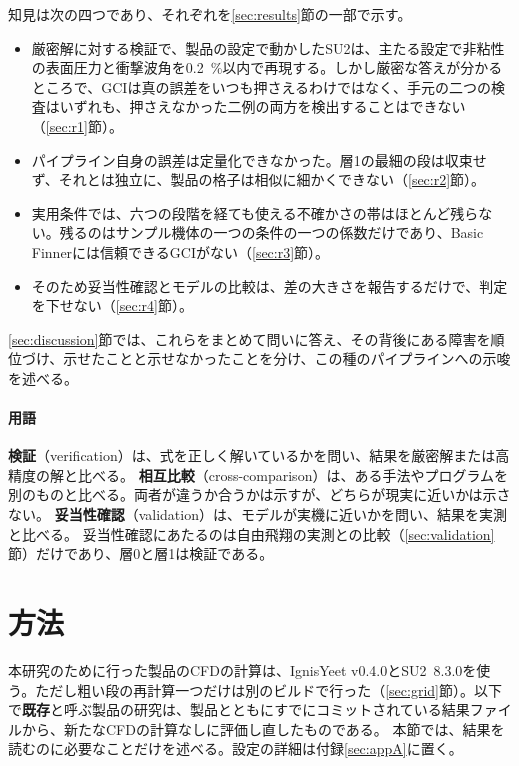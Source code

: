 \documentclass[twocolumn]{labreport}
\begin{document}
知見は次の四つであり、それぞれを\ref{sec:results}節の一部で示す。
\begin{itemize}
\item 厳密解に対する検証で、製品の設定で動かしたSU2は、主たる設定で非粘性の表面圧力と衝撃波角を0.2~\%以内で再現する。しかし厳密な答えが分かるところで、GCIは真の誤差をいつも押さえるわけではなく、手元の二つの検査はいずれも、押さえなかった二例の両方を検出することはできない（\ref{sec:r1}節）。
\item パイプライン自身の誤差は定量化できなかった。層1の最細の段は収束せず、それとは独立に、製品の格子は相似に細かくできない（\ref{sec:r2}節）。
\item 実用条件では、六つの段階を経ても使える不確かさの帯はほとんど残らない。残るのはサンプル機体の一つの条件の一つの係数だけであり、Basic Finnerには信頼できるGCIがない（\ref{sec:r3}節）。
\item そのため妥当性確認とモデルの比較は、差の大きさを報告するだけで、判定を下せない（\ref{sec:r4}節）。
\end{itemize}
\ref{sec:discussion}節では、これらをまとめて問いに答え、その背後にある障害を順位づけ、示せたことと示せなかったことを分け、この種のパイプラインへの示唆を述べる。

\paragraph{用語}
\textbf{検証}（verification）は、式を正しく解いているかを問い、結果を厳密解または高精度の解と比べる。
\textbf{相互比較}（cross-comparison）は、ある手法やプログラムを別のものと比べる。両者が違うか合うかは示すが、どちらが現実に近いかは示さない。
\textbf{妥当性確認}（validation）は、モデルが実機に近いかを問い、結果を実測と比べる。
妥当性確認にあたるのは自由飛翔の実測との比較（\ref{sec:validation}節）だけであり、層0と層1は検証である。

\section{方法}
\label{sec:method}

本研究のために行った製品のCFDの計算は、IgnisYeet v0.4.0とSU2~8.3.0を使う。ただし粗い段の再計算一つだけは別のビルドで行った（\ref{sec:grid}節）。以下で\textbf{既存}と呼ぶ製品の研究は、製品とともにすでにコミットされている結果ファイルから、新たなCFDの計算なしに評価し直したものである。
本節では、結果を読むのに必要なことだけを述べる。設定の詳細は付録\ref{sec:appA}に置く。
\end{document}
